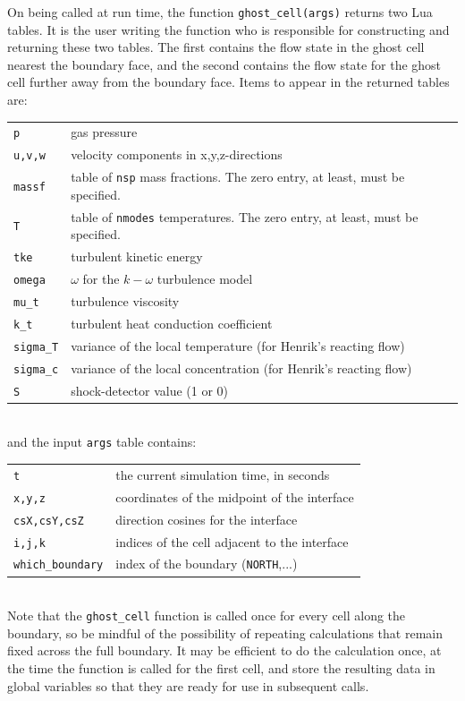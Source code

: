 \medskip
On being called at run time, the function \texttt{ghost\_cell(args)} returns two Lua tables.
It is the user writing the function who is responsible for constructing and returning
these two tables.
The first contains the flow state in the ghost cell nearest the boundary face, 
and the second contains the flow state for the ghost cell further away from the boundary face.
Items to appear in the returned tables are:\\
\begin{tabular}{lp{12cm}}
 \texttt{p} &  gas pressure \\
 \texttt{u,v,w} & velocity components in x,y,z-directions \\
 \texttt{massf} & table of \texttt{nsp} mass fractions. The zero entry, at least, must be specified. \\
 \texttt{T} & table of \texttt{nmodes} temperatures. The zero entry, at least, must be specified. \\
 \texttt{tke} &  turbulent kinetic energy \\
 \texttt{omega} &  $\omega$ for the $k-\omega$ turbulence model \\
 \texttt{mu\_t} &  turbulence viscosity \\
 \texttt{k\_t} &  turbulent heat conduction coefficient \\
 \texttt{sigma\_T} & variance of the local temperature (for Henrik's reacting flow) \\
 \texttt{sigma\_c} & variance of the local concentration (for Henrik's reacting flow) \\
 \texttt{S} & shock-detector value (1 or 0) \\
\end{tabular}\\
and the input \texttt{args} table contains:\\
\begin{tabular}{lp{12cm}}
 \texttt{t} &  the current simulation time, in seconds \\
 \texttt{x,y,z} &  coordinates of the midpoint of the interface\\
 \texttt{csX,csY,csZ} &  direction cosines for the interface\\
 \texttt{i,j,k} &  indices of the cell adjacent to the interface\\
 \texttt{which\_boundary} & index of the boundary (\texttt{NORTH},...) \\
\end{tabular}\\
Note that the \texttt{ghost\_cell} function is called once for every cell along the boundary,
so be mindful of the possibility of repeating calculations that remain fixed across the full boundary.
It may be efficient to do the calculation once, at the time the function is called for the first cell,
and store the resulting data in global variables so that they are ready for use in subsequent calls. 

